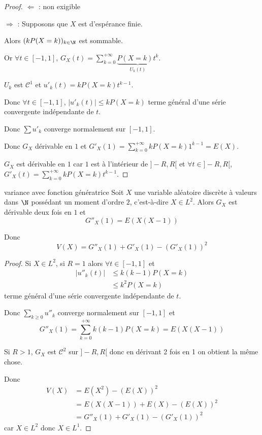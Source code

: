 \begin{proof}
    $\Leftarrow$ : non exigible 

    $\Rightarrow$ : Supposons que $X$ est d'espérance finie.
    

    Alors 
    $(k P(X = k))_{k \in \N}$ est sommable. 

    Or $\forall t \in [-1, 1]$, $G_X(t) = \sum_{k = 0}^{+\infty} \underbrace{P(X = k) t^k}_{U_k(t)}$.

    $U_k$ est $\mathscr C^1$ et $u'_k(t) = k P(X = k) t^{k - 1}$.

    Donc $\forall t \in [-1, 1]$, $|u'_k(t)| \leqslant k P(X = k)$ terme général d'une série convergente 
    indépendante de $t$. 

    Donc $\sum u'_k$ converge normalement sur $[-1, 1]$.

    Donc $G_X$ dérivable en $1$ et $\displaystyle G'_X(1) = \sum_{k = 0}^{+\infty} k P(X = k) 1^{k - 1} = E(X)$.


    $G_X$ est dérivable en $1$ car $1$ est à l'intérieur de $]-R, R[$
    et $\forall t \in ]-R, R[$, $\displaystyle G'_X(t) = \sum_{k = 0}^{+\infty} k P(X = k) t^{k - 1}$.
\end{proof}

\begin{corollaire}{variance avec fonction génératrice}{}
    Soit $X$ une variable aléatoire discrète à  valeurs dans $\N$ possédant un moment 
    d'ordre $2$, c'est-à-dire $X \in L^2$. Alors 
    $G_X$ est dérivable deux fois en $1$ et
    $$ G''_X(1) = E(X(X - 1)) $$

    Donc $$ V(X) = G''_X(1) + G'_X(1) - (G'_X(1))^2 $$
\end{corollaire}

\begin{proof}
    Si $X \in L^2$, si $R = 1$ alors 
    $\forall t \in [-1, 1]$ et 
    \begin{align}
        |u''_k(t)| & \leqslant k(k - 1) P(X = k) \\
        & \leqslant k^2 P(X = k)
    \end{align}
    terme général d'une série convergente indépendante de $t$.

    Donc $\sum_{k \geqslant 0} u''_k$ converge normalement sur $[-1, 1]$ et 
    $$G''_X(1) = \sum_{k = 0}^{+\infty} k (k - 1) P(X = k) = E(X(X - 1))$$

    Si $R > 1$, $G_X$ est $\mathscr C^2$ sur $]-R, R[$ donc en dérivant 2 fois en 1 on obtient 
    la même chose.

    Donc \begin{align}
        V(X) & = E(X^2) - (E(X))^2 \\
        & = E(X(X - 1)) + E(X) - (E(X))^2 \\
        & = G''_X(1) + G'_X(1) - (G'_X(1))^2
    \end{align}
    car $X \in L^2$ donc $X \in L^1$.
\end{proof}

